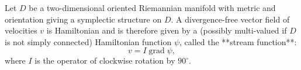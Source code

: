 Let $D$ be a two-dimensional oriented Riemannian manifold with metric and orientation giving a symplectic structure on $D$. A divergence-free vector field of velocities $v$ is Hamiltonian and is therefore given by a (possibly multi-valued if $D$ is not simply connected) Hamiltonian function $\psi$, called the **stream function**:
$$v = I \operatorname{grad} \psi,$$
where $I$ is the operator of clockwise rotation by $90^\circ$.
